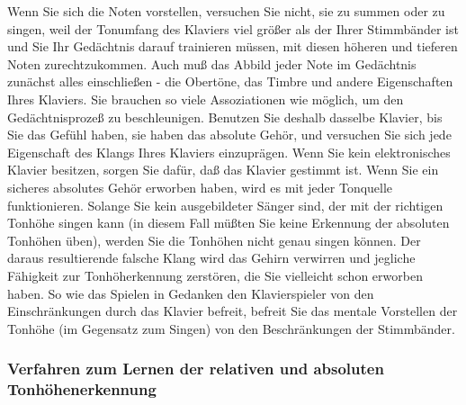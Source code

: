 Wenn Sie sich die Noten vorstellen, versuchen Sie nicht, sie zu summen oder zu singen, weil der Tonumfang des Klaviers viel größer als der Ihrer Stimmbänder ist und Sie Ihr Gedächtnis darauf trainieren müssen, mit diesen höheren und tieferen Noten zurechtzukommen.
Auch muß das Abbild jeder Note im Gedächtnis zunächst alles einschließen - die Obertöne, das Timbre und andere Eigenschaften Ihres Klaviers.
Sie brauchen so viele Assoziationen wie möglich, um den Gedächtnisprozeß zu beschleunigen.
Benutzen Sie deshalb dasselbe Klavier, bis Sie das Gefühl haben, sie haben das absolute Gehör, und versuchen Sie sich jede Eigenschaft des Klangs Ihres Klaviers einzuprägen.
Wenn Sie kein elektronisches Klavier besitzen, sorgen Sie dafür, daß das Klavier gestimmt ist.
Wenn Sie ein sicheres absolutes Gehör erworben haben, wird es mit jeder Tonquelle funktionieren.
Solange Sie kein ausgebildeter Sänger sind, der mit der richtigen Tonhöhe singen kann (in diesem Fall müßten Sie keine Erkennung der absoluten Tonhöhen üben), werden Sie die Tonhöhen nicht genau singen können.
Der daraus resultierende falsche Klang wird das Gehirn verwirren und jegliche Fähigkeit zur Tonhöherkennung zerstören, die Sie vielleicht schon erworben haben.
So wie das Spielen in Gedanken den Klavierspieler von den Einschränkungen durch das Klavier befreit, befreit Sie das mentale Vorstellen der Tonhöhe (im Gegensatz zum Singen) von den Beschränkungen der Stimmbänder.


\subsubsection{Verfahren zum Lernen der relativen und absoluten Tonhöhenerkennung}\hypertarget{c1iii12tonhoehe}{}

